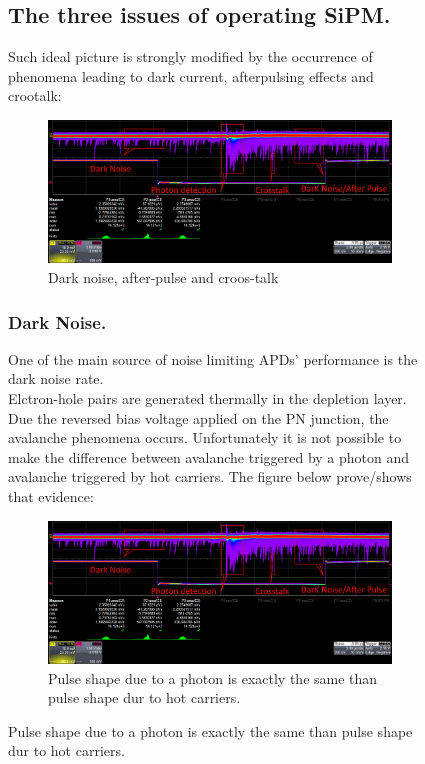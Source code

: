 \begin{figure}[!hbtp]
  \subsection{The three issues of operating SiPM.} 
  
  Such ideal picture is strongly modified by the occurrence of phenomena leading to dark current, afterpulsing effects and crootalk: 
  
  \begin{figure}[!hbtp]
  \centering
  \includegraphics[totalheight=0.22\textwidth,trim=0cm 6.5cm 0cm 0cm, clip=true]{Pictures/blabla/DN_AP_CT_1.png}
  \caption{Dark noise, after-pulse and croos-talk}
  \label{fig:DN_AP_CT}
  \end{figure}
  
  \subsubsection{Dark Noise.}
  
  One of the main source of noise limiting APDs' performance is the dark noise rate.\\
  Elctron-hole pairs are generated thermally in the depletion layer. Due the reversed bias voltage applied on the PN junction, 
  the avalanche phenomena occurs.
  Unfortunately it is not possible to make the difference between avalanche triggered by a photon and avalanche triggered by hot carriers.
  The figure below prove/shows that evidence:
  
  \begin{figure}[!hbtp]
  \centering
  \includegraphics[totalheight=0.22\textwidth,trim=0cm 6.5cm 0cm 0cm, clip=true]{Pictures/blabla/DN_AP_CT_1.png}
  \caption{Pulse shape due to a photon is exactly the same than pulse shape dur to hot carriers.}
  \label{fig:DN_photon}
  \end{figure}
  

\end{figure}
